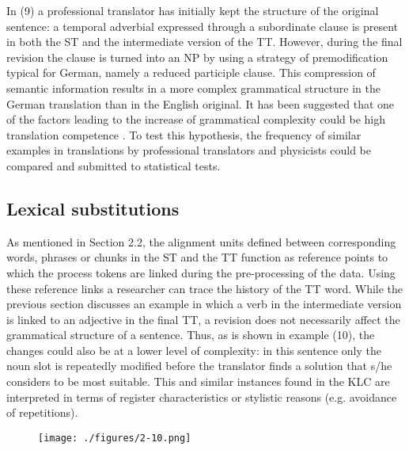 \documentclass[output=paper]{LSP/langsci}
\begin{document}
In (9) a professional translator has initially kept the structure of the original sentence: a temporal adverbial expressed through a subordinate clause is present in both the ST and the intermediate version of the TT. However, during the final revision the clause is turned into an NP by using a strategy of premodification typical for German, namely a reduced participle clause. This compression of semantic information results in a more complex grammatical structure in the German translation than in the English original. It has been suggested that one of the factors leading to the increase of grammatical complexity could be high translation competence \citep[260]{Hansen-Schirra2012}. To test this hypothesis, the frequency of similar examples in translations by professional translators and physicists could be compared and submitted to statistical tests. 

\subsection{Lexical substitutions}
As mentioned in Section 2.2, the alignment units defined between corresponding words, phrases or chunks in the ST and the TT function as reference points to which the process tokens are linked during the pre-processing of the data. Using these reference links a researcher can trace the history of the TT word. While the previous section discusses an example in which a verb in the intermediate version is linked to an adjective in the final TT, a revision does not necessarily affect the grammatical structure of a sentence. Thus, as is shown in example (10), the changes could also be at a lower level of complexity: in this sentence only the noun slot is repeatedly modified before the translator finds a solution that s/he considers to be most suitable. This and similar instances found in the KLC are interpreted in terms of register characteristics or stylistic reasons (e.g. avoidance of repetitions).

\begin{figure}
\texttt{[image: ./figures/2-10.png]}
\end{figure}

\end{document}
